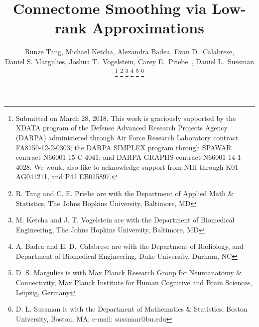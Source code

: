 \documentclass[journal,twoside,web]{ieeecolor}
\date{}
\begin{document}
\title{Connectome Smoothing via Low-rank Approximations}
\author{Runze Tang,
Michael Ketcha,
Alexandra Badea, 
Evan D.~Calabrese,\\
Daniel S. Margulies,
Joshua T.~Vogelstein,
Carey E.~Priebe~,
Daniel L.~Sussman%
\thanks{
Submitted on March 28, 2018.
This work is graciously supported by the XDATA program of the Defense
Advanced Research Projects Agency (DARPA) administered through Air
Force Research Laboratory contract FA8750-12-2-0303; the DARPA SIMPLEX
program through SPAWAR contract N66001-15-C-4041; and DARPA GRAPHS
contract N66001-14-1-4028. We would also like to acknowledge support from NIH through K01 AG041211, and P41 EB015897.}
\thanks{R. Tang and C. E. Priebe are with the Department of Applied Math \& Statistics, The Johns Hopkins University, Baltimore, MD}
\thanks{M. Ketcha and J. T. Vogelstein are with the Department of Biomedical Engineering,  The Johns Hopkins University, Baltimore, MD}
\thanks{A. Badea and E. D.~Calabrese are with the Department of Radiology, and Department of Biomedical Engineering, Duke University, Durham, NC}
\thanks{D. S. Margulies is with Max Planck Research Group for Neuroanatomy \& Connectivity, Max Planck Institute for Human Cognitive and Brain Sciences, Leipzig, Germany}
\thanks{D. L. Sussman is with the Department of Mathematics \& Statistics, Boston University, Boston, MA; e-mail: sussman@bu.edu}}









\maketitle
\end{document}
